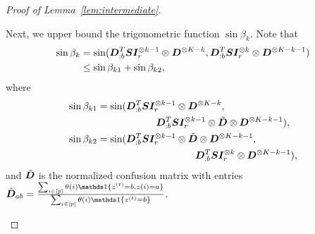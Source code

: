 \documentclass[journal]{IEEEtran}
\theoremstyle{definition}
\theoremstyle{definition}
\begin{document}
\begin{proof}[Proof of Lemma~\ref{lem:intermediate}]
\begin{enumerate}[wide]
    Next, we upper bound the trigonometric function $\sin \beta_k$. Note that
    \begin{align}
         \sin \beta_k &= \sin ({\bm{D}_{:b}^{T} \bm S \bm I_r^{\otimes k-1} \otimes \bm{D}^{\otimes K-k} }, {\bm{D}_{:b}^{T} \bm S \bm I_r^{\otimes k} \otimes \bm{D}^{\otimes K-k-1} } )\\
         &\leq \sin \beta_{k1} + \sin \beta_{k2},
    \end{align}
    where
    \begin{align}
         \sin \beta_{k1} &= \sin ({\bm{D}_{:b}^{T} \bm S \bm I_r^{\otimes k-1} \otimes \bm{D}^{\otimes K-k} }, \\
         & \quad   \quad\quad \quad\quad \quad {\bm{D}_{:b}^{T} \bm S\bm I_r^{\otimes k-1} \otimes \tilde {\bm{D}}\otimes \bm{D}^{\otimes K-k-1} } ),\\
         \sin \beta_{k2} & = \sin ({\bm{D}_{:b}^{T} \bm S \bm I_r^{\otimes k-1} \otimes \tilde {\bm{D}} \otimes \bm{D}^{\otimes K-k-1} } ,\\
         &\quad \quad \quad \quad \quad \quad\quad \quad\quad \quad  {\bm{D}_{:b}^{T} \bm S\bm I_r^{\otimes k} \otimes \bm{D}^{\otimes K-k-1} }   ),
    \end{align}
    and $\tilde {\bm{D}}$ is the normalized confusion matrix with entries $\tilde \mD_{ab} = \frac{\sum_{i \in [p]} \theta(i) \ind\{z^{(t)} = b, z(i) = a\}}{\sum_{i \in [p] }\theta(i) \ind\{z^{(t)} = b\}}$.
    
    

\end{enumerate}
\end{proof}
\end{document}
